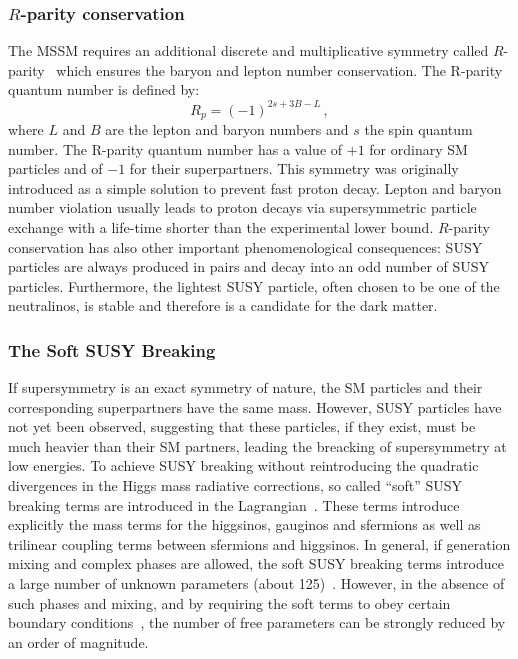 \subsubsection{$R$-parity conservation}
The MSSM requires an additional discrete and multiplicative symmetry called $R$-parity~\cite{Susy3} which ensures the baryon and lepton number 
conservation. The R-parity quantum number  is defined by:
\begin{equation}
R_p = (-1)^{2s+3B-L}\,,
\end{equation}
where $L$ and $B$ are the lepton and baryon numbers and $s$  the spin quantum number. The R-parity quantum number has a value of $+1$ for ordinary
SM particles and of $-1$ for their superpartners. This symmetry was originally introduced as a simple solution to 
prevent fast proton decay. Lepton and baryon number violation usually leads to
proton decays via supersymmetric particle exchange with a life-time shorter than the 
experimental lower bound. $R$-parity conservation has also other important 
phenomenological consequences: SUSY particles are always produced in pairs and decay  into an odd number of SUSY particles.
Furthermore, the lightest SUSY particle, often chosen to be one of the neutralinos, is stable and therefore is a 
candidate for the dark matter.


\subsubsection{The Soft SUSY Breaking}
If supersymmetry is an exact symmetry of nature, the SM particles and their corresponding superpartners  have the same mass. 
However, SUSY particles have not yet been observed, suggesting that  these particles,
if they exist,  must be much heavier than their SM partners, leading the breacking of supersymmetry at low energies. 
To achieve SUSY breaking without reintroducing the quadratic divergences in the Higgs mass
radiative corrections,  so called ``soft'' SUSY breaking terms are 
introduced in the Lagrangian~\cite{softerm1,softerm2}. 
These terms introduce explicitly the mass terms for the higgsinos, gauginos and
sfermions as well as  trilinear coupling terms between sfermions and higgsinos. 
In general, if generation mixing and complex phases are allowed, the soft SUSY breaking 
terms  introduce a  large number of unknown parameters (about 125)~\cite{softerm3}.
However, in the absence of such phases and  mixing, and  by requiring  the soft terms to 
obey  certain  boundary conditions~\cite{softerm1,softerm2}, the number of free parameters can be strongly reduced by an order of 
magnitude.


